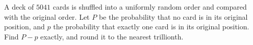 A deck of $5041$ cards is shuffled into a uniformly random order and compared with the original order. Let $P$ be the probability that no card is in its original position, and $p$ the probability that exactly one card is in its original position. Find $P-p$ exactly, and round it to the nearest trillionth.
